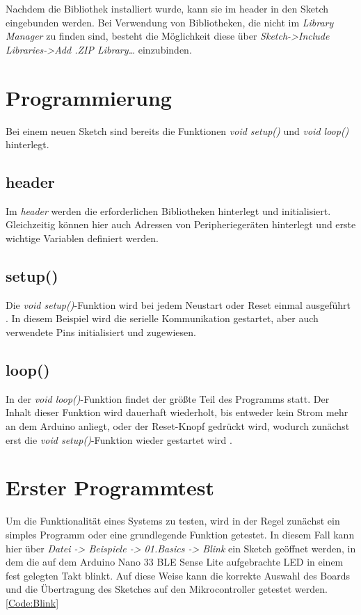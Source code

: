 Nachdem die Bibliothek installiert wurde, kann sie im header in den Sketch eingebunden werden.
Bei Verwendung von Bibliotheken, die nicht im \textit{Library Manager} zu finden sind, besteht die Möglichkeit diese über \textit{Sketch->Include Libraries->Add .ZIP Library…} einzubinden.

\section{Programmierung}

Bei einem neuen Sketch sind bereits die Funktionen \textit{void setup()} und \textit{void loop()} hinterlegt.

\subsection{header}

Im \textit{header} werden die erforderlichen Bibliotheken hinterlegt und initialisiert. Gleichzeitig können hier auch Adressen von Peripheriegeräten hinterlegt und erste wichtige Variablen definiert werden.

\subsection{setup()}

Die \textit{void setup()}-Funktion wird bei jedem Neustart oder Reset einmal ausgeführt \cite{ArdIDE.2024d}.
In diesem Beispiel wird die serielle Kommunikation gestartet, aber auch verwendete Pins initialisiert und zugewiesen.

\subsection{loop()}

In der \textit{void loop()}-Funktion findet der größte Teil des Programms statt. Der Inhalt dieser Funktion wird dauerhaft wiederholt, bis entweder kein Strom mehr an dem Arduino anliegt, oder der Reset-Knopf gedrückt wird, wodurch zunächst erst die \textit{void setup()}-Funktion wieder gestartet wird \cite{ArdIDE.2024e}.

\section{Erster Programmtest}\label{ersterprogrammtest}

Um die Funktionalität eines Systems zu testen, wird in der Regel zunächst ein simples Programm oder eine grundlegende Funktion getestet.
In diesem Fall kann hier über \textit{Datei -> Beispiele -> 01.Basics -> Blink} ein Sketch geöffnet werden, in dem die auf dem Arduino Nano 33 BLE Sense Lite aufgebrachte LED in einem fest gelegten Takt blinkt. Auf diese Weise kann die korrekte Auswahl des Boards und die Übertragung des Sketches auf den Mikrocontroller getestet werden.
\ref{Code:Blink}


